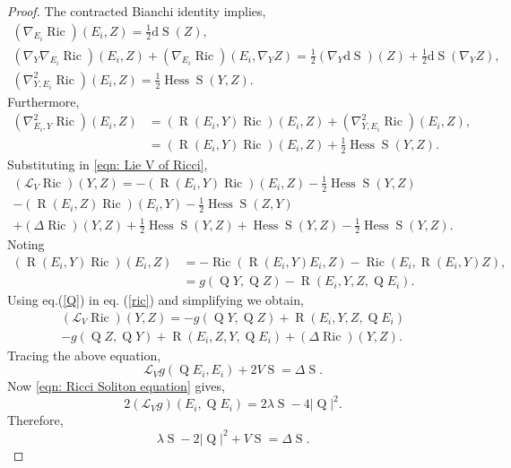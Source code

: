 \documentclass{amsart}
\newcommand{\abs}[1]{\left| #1 \right|}
\newcommand{\lie}[1]{\mathcal{L}_{#1}}
\DeclareMathOperator*{\ricci}{Ric}
\DeclareMathOperator*{\Qricci}{Q}
\DeclareMathOperator*{\scalar}{S}
\DeclareMathOperator*{\curvature}{R}
\DeclareMathOperator*{\hessian}{Hess}
\theoremstyle{plain}
\theoremstyle{plain}
\theoremstyle{plain}
\theoremstyle{plain}
\theoremstyle{remark}
\begin{document}
\begin{proof}
The contracted Bianchi identity implies,
\begin{gather*}
    (\nabla_{E_i} \ricci) (E_i , Z ) = \frac{1}{2} \mathrm{d} \scalar (Z), \\
    (\nabla_Y \nabla_{E_i} \ricci) (E_i, Z) + (\nabla_{E_i} \ricci) (E_i, \nabla_Y Z)
        = \frac{1}{2} ( \nabla_Y \mathrm{d}\scalar )(Z) + \frac{1}{2} \mathrm{d}\scalar (\nabla_Y Z), \\
    (\nabla^2_{Y,E_i} \ricci) (E_i, Z) = \frac{1}{2} \hessian \scalar (Y,Z).
\end{gather*}
Furthermore,
\begin{align*}
    (\nabla^2_{E_i,Y} \ricci) (E_i,Z) &= (\curvature(E_i, Y)\ricci)(E_i, Z) + (\nabla^2_{Y,E_i} \ricci) (E_i, Z), \\
        &= (\curvature(E_i, Y)\ricci)(E_i, Z) + \frac{1}{2}\hessian\scalar (Y, Z).
\end{align*}
Substituting in \cref{eqn: Lie V of Ricci},
\begin{multline}\label{ric}
    (\lie{V}\ricci)(Y,Z) = 
            -(\curvature(E_i,Y)\ricci )(E_i,Z) - \frac{1}{2}\hessian\scalar(Y,Z)  \\
            -(\curvature(E_i,Z)\ricci )(E_i,Y) - \frac{1}{2}\hessian\scalar(Z,Y) \\
            + ({\Delta} \ricci)(Y,Z) + \frac{1}{2} \hessian\scalar(Y,Z) + \hessian\scalar(Y,Z) - \frac{1}{2} \hessian\scalar(Y,Z).
\end{multline}
Noting
\begin{align} 
    (\curvature(E_i,Y)\ricci )(E_i,Z) &= - \ricci ( \curvature(E_i,Y) E_i, Z ) - \ricci ( E_i, \curvature(E_i,Y)Z ), \\\label{Q}
        &= g( \Qricci Y, \Qricci Z ) - \curvature( E_i, Y, Z, \Qricci E_i ). 
\end{align}
 Using eq.(\ref{Q}) in eq. (\ref{ric})
 and simplifying we obtain,
\begin{multline}
    (\lie{V}\ricci)(Y,Z) = 
            -g( \Qricci Y, \Qricci Z ) + \curvature(E_i, Y,Z, \Qricci E_i) \\
            -g( \Qricci Z, \Qricci Y ) + \curvature(E_i, Z,Y, \Qricci E_i)
            +({\Delta} \ricci)(Y,Z) .
\end{multline}
Tracing the above equation,
\begin{equation*}
    \lie{V}g (\Qricci E_i, E_i) + 2 V \scalar = \Delta \scalar.
\end{equation*}
Now \cref{eqn: Ricci Soliton equation} gives,
\begin{equation*}
    2(\lie{V}g)(E_i, \Qricci E_i) = 2\lambda \scalar -4 \abs{\Qricci}^2.
\end{equation*}
Therefore,
\begin{equation*}
    \lambda\scalar - 2\abs{\Qricci}^2 + V\scalar = \Delta\scalar.
\end{equation*}

\end{proof}
\end{document}
